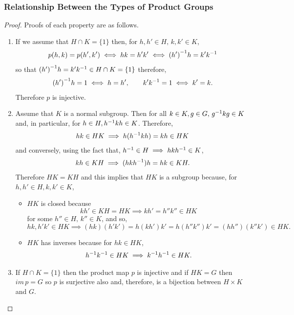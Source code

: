 \documentclass[MathsNotesBase.tex]{subfiles}
\begin{document}
{		\subsubsection{Relationship Between the Types of Product Groups}
		\medskip		
		\begin{proof}
			Proofs of each property are as follows.
			\begin{enumerate}[label=(\roman*)]
				\item{If we assume that ${ H \cap K = \{1\} }$ then, for ${ h,h' \in H,\, k,k' \in K }$,
					\[ p(h,k) = p(h', k') \iff hk = h'k' \iff {(h')}^{-1}h = k'{k}^{-1} \]
					so that ${ {(h')}^{-1}h = k'{k}^{-1} \in H \cap K = \{1\} }$ therefore,
					\[ {(h')}^{-1}h = 1 \iff h = h',\hspace{20pt} k'{k}^{-1} = 1 \iff k' = k. \]
					Therefore $p$ is injective.
				}
				\item{Assume \WLOG that $K$ is a normal subgroup. Then for all ${ k \in K,g \in G,\, {g}^{-1}kg \in K }$ and, in particular, for ${ h \in H, {h}^{-1}kh \in K }$. Therefore,
					\[  hk \in HK \implies h({h}^{-1}kh) = kh \in HK \]
					and conversely, using the fact that, ${ {h}^{-1} \in H \implies hk{h}^{-1} \in K }$,
					\[ kh \in KH \implies (hk{h}^{-1})h = hk \in KH. \]
					Therefore ${ HK = KH }$ and this implies that $HK$ is a subgroup because, for ${ h,h' \in H, k,k' \in K }$,
					\begin{itemize}
						\item{$HK$ is closed because
							\[ kh' \in KH = HK \implies kh' = h''k'' \in HK  \]
							for some ${ h'' \in H,\, k'' \in K }$, and so,
							\[ hk,h'k' \in HK \implies (hk)(h'k') = h(kh')k' = h(h''k'')k' = (hh'')(k''k') \in HK. \]
						}
						\item{$HK$ has inverses because for ${ hk \in HK }$,
							\[ {h}^{-1}{k}^{-1} \in HK \implies {k}^{-1}{h}^{-1} \in HK. \]
						}
					\end{itemize}
				}
				\item{If ${ H \cap K = \{1\} }$ then the product map $p$ is injective and if ${ HK = G }$ then ${ im\,p = G }$ so $p$ is surjective also and, therefore, is a bijection between ${ H \times K}$ and ${ G }$.\\
					
}
\end{enumerate}
\end{proof}}
\end{document}
